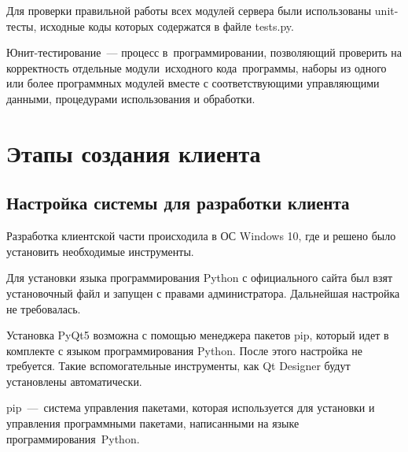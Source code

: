 Для проверки правильной работы всех модулей сервера были использованы unit-тесты, исходные коды которых содержатся в файле tests.py.
\begin{definition}
    Юнит-тестирование --- процесс в программировании, позволяющий проверить на корректность отдельные модули исходного кода программы,
    наборы из одного или более программных модулей вместе с соответствующими управляющими данными, процедурами использования и обработки. 
\end{definition}



\clearpage
\section{Этапы создания клиента}
\subsection{Настройка системы для разработки клиента}
Разработка клиентской части происходила в ОС Windows 10, где и решено было установить необходимые инструменты.

Для установки языка программирования Python с официального сайта был взят установочный файл и запущен с правами администратора.
Дальнейшая настройка не требовалась.

Установка PyQt5 возможна с помощью менеджера пакетов pip, который идет в комплекте с языком программирования Python.
После этого настройка не требуется. Такие вспомогательные инструменты, как Qt Designer будут установлены автоматически.
\begin{definition}
    pip --- система управления пакетами, которая используется для установки и управления программными пакетами, написанными на языке программирования Python.
\end{definition}


\clearpage
